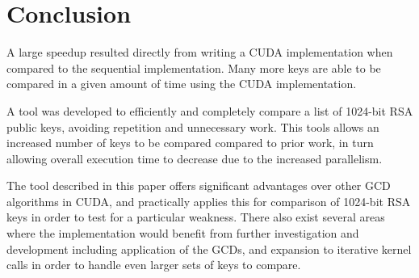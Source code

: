 \documentclass[12pt]{ucthesis}
\begin{document}

\section{Conclusion}
A large speedup resulted directly from writing a CUDA 
implementation when compared to the sequential implementation. Many 
more keys are able to be compared in a given amount of time using the CUDA
implementation. 

A tool was developed to efficiently and completely compare a list of 1024-bit 
RSA public keys, avoiding repetition and unnecessary work. This 
tools allows an increased number of keys to be compared 
compared to prior work, in turn allowing overall execution time to decrease due 
to the increased parallelism.

The tool described in this paper offers significant advantages over other GCD 
algorithms in CUDA, and practically applies this for comparison of 1024-bit 
RSA keys in order to test for a particular weakness. There also exist 
several areas where the implementation would benefit from further 
investigation and development including application of the GCDs, and 
expansion to iterative kernel calls in order to handle even larger sets of 
keys to compare.
\end{document}
